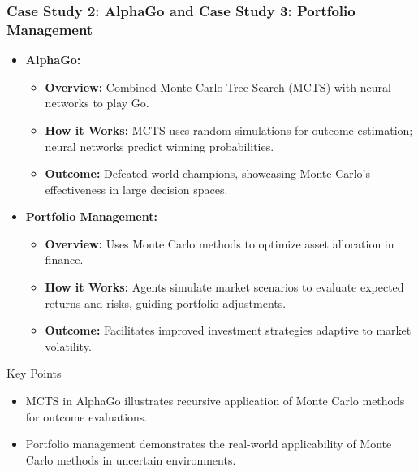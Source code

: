 \documentclass[aspectratio=169]{beamer}
\begin{document}
\begin{frame}[fragile]
    \frametitle{Case Study 2: AlphaGo and Case Study 3: Portfolio Management}
    \begin{itemize}
        \item \textbf{AlphaGo:}
        \begin{itemize}
            \item \textbf{Overview:} Combined Monte Carlo Tree Search (MCTS) with neural networks to play Go.
            \item \textbf{How it Works:} MCTS uses random simulations for outcome estimation; neural networks predict winning probabilities.
            \item \textbf{Outcome:} Defeated world champions, showcasing Monte Carlo’s effectiveness in large decision spaces.
        \end{itemize}
        
        \item \textbf{Portfolio Management:}
        \begin{itemize}
            \item \textbf{Overview:} Uses Monte Carlo methods to optimize asset allocation in finance.
            \item \textbf{How it Works:} Agents simulate market scenarios to evaluate expected returns and risks, guiding portfolio adjustments.
            \item \textbf{Outcome:} Facilitates improved investment strategies adaptive to market volatility.
        \end{itemize}
    \end{itemize}
    \begin{block}{Key Points}
        \begin{itemize}
            \item MCTS in AlphaGo illustrates recursive application of Monte Carlo methods for outcome evaluations.
            \item Portfolio management demonstrates the real-world applicability of Monte Carlo methods in uncertain environments.
        \end{itemize}
    \end{block}
\end{frame}
\end{document}
